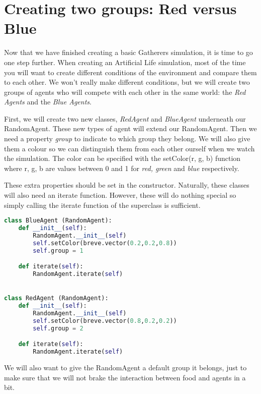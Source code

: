 \section{Creating two groups: Red versus Blue}
Now that we have finished creating a basic Gatherers simulation, it is time to go one step further. When creating an Artificial Life simulation, most of the time you will want to create different conditions of the environment and compare them to each other. We won't really make different conditions, but we will create two groups of agents who will compete with each other in the same world: the \textit{Red Agents} and the \textit{Blue Agents}.

First, we will create two new classes, \textit{RedAgent}  and \textit{BlueAgent} underneath our RandomAgent. These new types of agent will extend our RandomAgent. Then we need a property \textit{group} to indicate to which group they belong. We will also give them a colour so we can distinguish them from each other ourself when we watch the simulation. The color can be specified with the setColor(r, g, b) function where r, g, b are values between 0 and 1 for \textit{red, green} and \textit{blue} respectively. 

These extra properties should be set in the constructor. Naturally, these classes will also need an iterate function. However, these will do nothing special so simply calling the iterate function of the superclass is sufficient. 


\begin{lstlisting}[language=Python]
class BlueAgent (RandomAgent):
	def __init__(self):
		RandomAgent.__init__(self)
		self.setColor(breve.vector(0.2,0.2,0.8))
		self.group = 1

	def iterate(self):
		RandomAgent.iterate(self)


class RedAgent (RandomAgent):
	def __init__(self):
		RandomAgent.__init__(self)
		self.setColor(breve.vector(0.8,0.2,0.2))
		self.group = 2

	def iterate(self):
		RandomAgent.iterate(self)
\end{lstlisting}

We will also want to give the RandomAgent a default group it belongs, just to make sure that we will not brake the interaction between food and agents in a bit.


